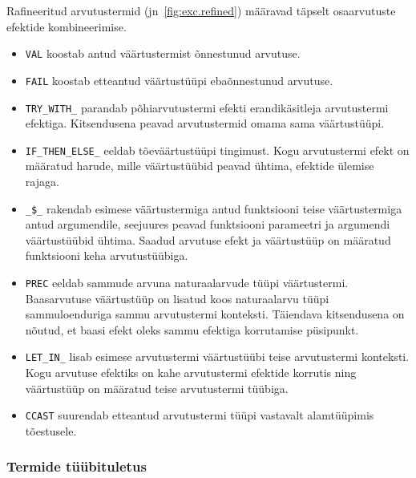 \documentclass[a4paper,12pt]{article}
\begin{document}
Rafineeritud arvutustermid (jn~\ref{fig:exc.refined}) määravad täpselt osaarvutuste efektide kombineerimise.
\begin{itemize}
\item {\tt VAL} koostab antud väärtustermist õnnestunud arvutuse.
\item {\tt FAIL} koostab etteantud väärtustüüpi ebaõnnestunud arvutuse.
\item {\tt TRY_WITH_} parandab põhiarvutustermi efekti erandikäsitleja arvutustermi efektiga. Kitsendusena peavad arvutustermid omama sama väärtustüüpi.
\item {\tt IF_THEN_ELSE_} eeldab tõeväärtustüüpi tingimust. Kogu arvutustermi efekt on määratud harude, mille väärtustüübid peavad ühtima, efektide ülemise rajaga.
\item {\tt _\$_} rakendab esimese väärtustermiga antud funktsiooni teise väärtustermiga antud argumendile, seejuures peavad funktsiooni parameetri ja argumendi väärtustüübid ühtima. Saadud arvutuse efekt ja väärtustüüp on määratud funktsiooni keha arvutustüübiga. 
\item {\tt PREC} eeldab sammude arvuna naturaalarvude tüüpi väärtustermi. Baasarvutuse väärtustüüp on lisatud koos naturaalarvu tüüpi sammuloenduriga sammu arvutustermi konteksti. Täiendava kitsendusena on nõutud, et baasi efekt oleks sammu efektiga korrutamise püsipunkt.
\item {\tt LET_IN_} lisab esimese arvutustermi väärtustüübi teise arvutustermi konteksti. Kogu arvutuse efektiks on kahe arvutustermi efektide korrutis ning väärtustüüp on määratud teise arvutustermi tüübiga.
\item {\tt CCAST} suurendab etteantud arvutustermi tüüpi vastavalt alamtüüpimis tõestusele.
\end{itemize}


\subsubsection{Termide tüübituletus}\label{sssec:exc.infer-type}
\end{document}
